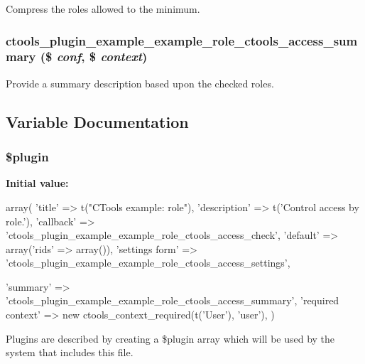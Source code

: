 \label{example__role_8inc_a6d49c7c77fa3846ebb7d708131966904}
Compress the roles allowed to the minimum. \hypertarget{example__role_8inc_a933cad4dca2ae3531311b8678d4a9f66}{
\subsubsection[{ctools\_\-plugin\_\-example\_\-example\_\-role\_\-ctools\_\-access\_\-summary}]{\setlength{\rightskip}{0pt plus 5cm}ctools\_\-plugin\_\-example\_\-example\_\-role\_\-ctools\_\-access\_\-summary (\$ {\em conf}, \/  \$ {\em context})}}
\label{example__role_8inc_a933cad4dca2ae3531311b8678d4a9f66}
Provide a summary description based upon the checked roles. 

\subsection{Variable Documentation}
\hypertarget{example__role_8inc_ada8a7130088351710bb02ed622d6bf65}{
\subsubsection[{\$plugin}]{\setlength{\rightskip}{0pt plus 5cm}\$plugin}}
\label{example__role_8inc_ada8a7130088351710bb02ed622d6bf65}
{\bfseries Initial value:}
\begin{DoxyCode}
 array(
  'title' => t("CTools example: role"),
  'description' => t('Control access by role.'),
  'callback' => 'ctools_plugin_example_example_role_ctools_access_check',
  'default' => array('rids' => array()),
  'settings form' => 'ctools_plugin_example_example_role_ctools_access_settings',
      
  'summary' => 'ctools_plugin_example_example_role_ctools_access_summary',
  'required context' => new ctools_context_required(t('User'), 'user'),
)
\end{DoxyCode}
Plugins are described by creating a \$plugin array which will be used by the system that includes this file. 